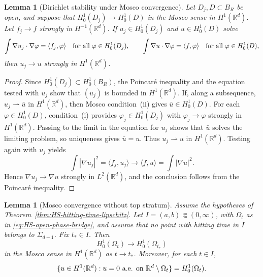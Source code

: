 \documentclass[11pt]{amsart}
\numberwithin{equation}{section}
\numberwithin{figure}{section}
\theoremstyle{plain}
\newtheorem{lem}[thm]{Lemma}
\theoremstyle{definition}
\theoremstyle{remark}
\theoremstyle{plain}
\def\R{\mathbb{R}}
\begin{document}
\begin{lem}[Dirichlet stability under Mosco convergence]\label{lem:mosco-dirichlet-stability}
Let $D_j,D\subset B_R$ be open, and suppose that $H^1_0(D_j)\to H^1_0(D)$ in the Mosco sense in $H^1(\R^d)$. Let $f_j\to f$ strongly in $H^{-1}(\R^d)$. If $u_j\in H^1_0(D_j)$ and $u\in H^1_0(D)$ solve
\[
    \int \nabla u_j\cdot\nabla\varphi=\langle f_j,\varphi\rangle
    \quad\hbox{for all }\varphi\in H^1_0(D_j),
    \qquad
    \int \nabla u\cdot\nabla\varphi=\langle f,\varphi\rangle
    \quad\hbox{for all }\varphi\in H^1_0(D),
\]
then $u_j\to u$ strongly in $H^1(\R^d)$.
\end{lem}
\begin{proof}
Since $H^1_0(D_j)\subset H^1_0(B_R)$, the Poincar\'e inequality and the
equation tested with $u_j$ show that $(u_j)$ is bounded in $H^1(\R^d)$.
If, along a subsequence, $u_j\rightharpoonup \bar u$ in $H^1(\R^d)$, then
Mosco condition~(ii) gives $\bar u\in H^1_0(D)$.  For each
$\varphi\in H^1_0(D)$, condition~(i) provides
$\varphi_j\in H^1_0(D_j)$ with $\varphi_j\to\varphi$ strongly in
$H^1(\R^d)$.  Passing to the limit in the equation for $u_j$ shows that
$\bar u$ solves the limiting problem, so uniqueness gives $\bar u=u$.
Thus $u_j\rightharpoonup u$ in $H^1(\R^d)$.  Testing again with $u_j$ yields
\[
    \int |\nabla u_j|^2=\langle f_j,u_j\rangle
    \longrightarrow \langle f,u\rangle=\int |\nabla u|^2.
\]
Hence $\nabla u_j\to\nabla u$ strongly in $L^2(\R^d)$, and the conclusion follows from the Poincar\'e
inequality.
\end{proof}
\begin{lem}[Mosco convergence without top stratum]\label{lem:no_top_mosco}
Assume the hypotheses of Theorem~\ref{thm:HS-hitting-time-lipschitz}.
Let $I=(a,b)\Subset(0,\infty)$, with \(\Omega_t\) as in
\eqref{eq:HS-open-phase-bridge}, and assume that no point with hitting time in $I$ belongs to $\Sigma_{d-1}$. Fix $t_*\in I$. Then
\[
    H^1_0(\Omega_t)\to H^1_0(\Omega_{t_*})
\]
in the Mosco sense in $H^1(\R^d)$ as $t\to t_*$.
Moreover, for each $t\in I$,
\[
    \{u\in H^1(\R^d):u=0\hbox{ a.e. on }\R^d\setminus\Omega_t\}
    =H^1_0(\Omega_t).
\]
\end{lem}
\end{document}
